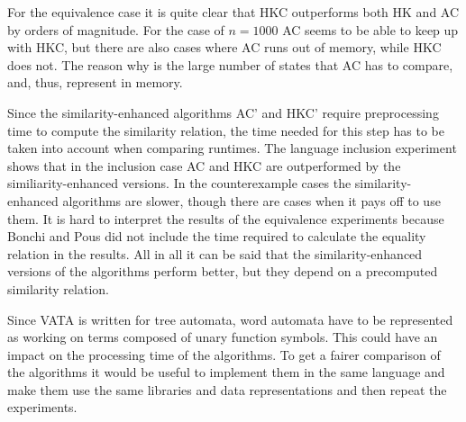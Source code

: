 For the equivalence case it is quite clear that HKC outperforms both HK and AC
by orders of magnitude.
For the case of $n = 1000$ AC seems to be able to keep up with HKC, but
there are also cases where AC runs out of memory, while HKC does not.
The reason why is the large number of states that AC has to compare, and, thus,
represent in memory.

Since the similarity-enhanced algorithms AC' and HKC' require preprocessing time
to compute the similarity relation, the time needed for this step has to be
taken into account when comparing runtimes.
The language inclusion experiment shows that in the inclusion case AC and HKC
are outperformed by the similiarity-enhanced versions.
In the counterexample cases the similarity-enhanced algorithms are slower,
though there are cases when it pays off to use them.
It is hard to interpret the results of the equivalence experiments because
Bonchi and Pous did not include the time required to calculate the equality
relation in the results.
All in all it can be said that the similarity-enhanced versions of the
algorithms perform better, but they depend on a precomputed similarity relation.

Since VATA is written for tree automata, word automata have to be represented
as working on terms composed of unary function symbols.
This could have an impact on the processing time of the algorithms.
To get a fairer comparison of the algorithms it would be useful to implement
them in the same language and make them use the same libraries and data
representations and then repeat the experiments.
